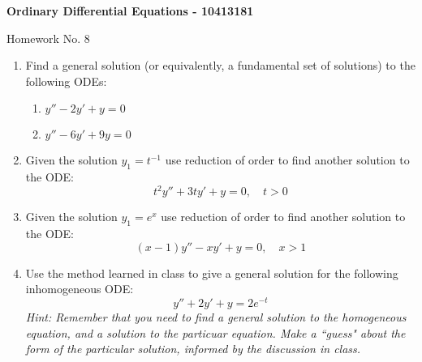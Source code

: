 \documentclass[10pt,a4paper]{letter}
\begin{document}
\begin{center}
\begin{Large}
\textbf{Ordinary Differential Equations - 10413181}\\
\end{Large}
\vspace{1em}
\begin{large}Homework No. 8\end{large}
\end{center}

\begin{enumerate}

\item Find a general solution (or equivalently, a fundamental set of solutions) to the following ODEs:
\begin{enumerate}
\item $ y'' - 2y' + y = 0 $ %
\item $y'' - 6y' + 9y = 0$  %
\end{enumerate}
\item Given the solution $y_1 = t^{-1}$ use reduction of order to find another solution to the ODE: 
\[ t^2 y'' + 3ty' + y = 0, \quad t > 0 \] %
\item Given the solution $y_1 = e^x$ use reduction of order to find another solution to the ODE:
\[ (x-1)y'' - xy' + y = 0, \quad x > 1 \] %
\item Use the method learned in class to give a general solution for the following inhomogeneous ODE:
\[ y'' + 2y' + y = 2e^{-t} \] %
\emph{Hint: Remember that you need to find a general solution to the homogeneous equation, and a solution to the particuar equation. Make a ``guess" about the form of the particular solution, informed by the discussion in class.}
\end{enumerate}
\end{document}
